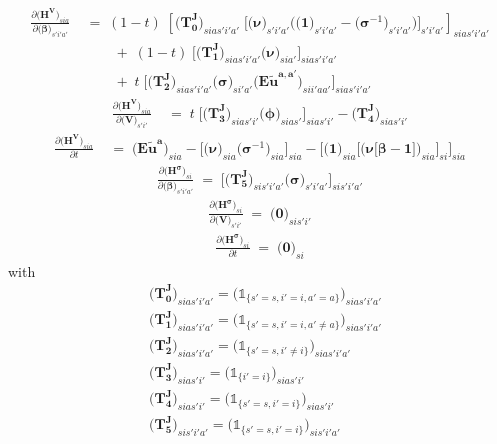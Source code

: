 \documentclass[11pt,fleqn]{article}
\newcommand{\bsigma}{\bm{\sigma}}
\newcommand{\bbeta}{\bm{\beta}}
\newcommand{\bV}{\bm{V}}
\newcommand{\bnu}{\bm{\nu}}
\newcommand{\bzero}{\bm{0}}
\newcommand{\bone}{\bm{1}}
\newcommand{\tu}{\tilde{u}}
\newcommand{\id}{\mathds{1}}
\begin{document}
\begin{align*}
	\frac{ \partial \biggl( \bm{H^{V}} \biggr)_{sia} }{ \partial \biggl( \bbeta \biggr)_{s'i'a'} } & \;=\; 
		(1-t) \; \left[ \biggl( \bm{T_0^J} \biggr)_{sias'i'a'} \; \Biggl[ \biggl( \bnu \biggr)_{s'i'a'} \Biggl( \biggl( \bone \biggr)_{s'i'a'} - \biggl( \bsigma^{-1} \biggr)_{s'i'a'} \Biggr) \Biggr]_{s'i'a'} \right]_{sias'i'a'} \\
		& \qquad \;+\;  (1-t) \; \Biggl[ \biggl( \bm{T_1^J} \biggr)_{sias'i'a'} \biggl( \bnu \biggr)_{sia'} \Biggr]_{sias'i'a'} \\
		& \qquad \;+\; t \; \Biggl[ \biggl( \bm{T_2^J} \biggr)_{sias'i'a'} \biggl( \bsigma \biggr)_{si'a'} \biggl( \bm{{E\tu^{a,a'}}} \biggr)_{sii'aa'} \Biggr]_{sias'i'a'}
\end{align*}
\begin{align*}
	\frac{ \partial \biggl( \bm{H^{V}} \biggr)_{sia} }{ \partial \biggl( \bV \biggr)_{s'i'} } & \;=\; 
		t \; \Biggl[ \biggl( \bm{T_3^J} \biggr)_{sias'i'} \biggl( \bm{\phi} \biggr)_{sias'} \Biggr]_{sias'i'} - \biggl( \bm{T_4^J} \biggr)_{sias'i'}
\end{align*}
\begin{align*}
	\frac{ \partial \biggl( \bm{H^{V}} \biggr)_{sia} }{ \partial t } & \;=\; 
		\biggl( \bm{{E\tu^{a}}} \biggr)_{sia} - \Biggl[ \biggl( \bnu \biggr)_{sia} \biggl( \bsigma^{-1} \biggr)_{sia} \Biggr]_{sia} - \Biggl[ \biggl( \bone \biggr)_{sia} \Biggl[ \biggl( \bnu\bigl[\bbeta-\bone\bigr] \biggr)_{sia} \Biggr]_{si} \Biggr]_{sia}
\end{align*}
\begin{align*}
	\frac{ \partial \biggl( \bm{H^{\sigma}} \biggr)_{si} }{ \partial \biggl( \bbeta \biggr)_{s'i'a'} } \;=\; 
	\Biggl[ \biggl( \bm{T_5^J} \biggr)_{sis'i'a'} \biggl( \bsigma \biggr)_{s'i'a'} \Biggr]_{sis'i'a'}
\end{align*}
\begin{align*}
	\frac{ \partial \biggl( \bm{H^{\sigma}} \biggr)_{si} }{ \partial \biggl( \bV \biggr)_{s'i'} } \;=\; \biggl( \bzero \biggr)_{sis'i'}
\end{align*}
\begin{align*}
	\frac{ \partial \biggl( \bm{H^{\sigma}} \biggr)_{si} }{ \partial t } \;=\; \biggl( \bzero \biggr)_{si}
\end{align*}
with
\begin{align*}
	& \biggl( \bm{T_0^J} \biggr)_{sias'i'a'} = \biggl( \id_{\{s'=s,i'=i,a'=a\}} \biggr)_{sias'i'a'} \\
	& \biggl( \bm{T_1^J} \biggr)_{sias'i'a'} = \biggl( \id_{\{s'=s,i'=i,a'\neq a\}} \biggr)_{sias'i'a'} \\
	& \biggl( \bm{T_2^J} \biggr)_{sias'i'a'} = \biggl( \id_{\{s'=s,i'\neq i\}} \biggr)_{sias'i'a'} \\
	& \biggl( \bm{T_3^J} \biggr)_{sias'i'} = \biggl( \id_{\{i'=i\}} \biggr)_{sias'i'} \\
	& \biggl( \bm{T_4^J} \biggr)_{sias'i'} = \biggl( \id_{\{s'=s,i'=i\}} \biggr)_{sias'i'} \\
	& \biggl( \bm{T_5^J} \biggr)_{sis'i'a'} = \biggl( \id_{\{s'=s,i'=i\}} \biggr)_{sis'i'a'}
\end{align*}
\end{document}
